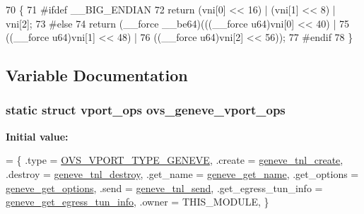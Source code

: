 \begin{DoxyCode}
70 \{
71 \textcolor{preprocessor}{#ifdef \_\_BIG\_ENDIAN}
72     \textcolor{keywordflow}{return} (vni[0] << 16) | (vni[1] << 8) | vni[2];
73 \textcolor{preprocessor}{#else}
74     \textcolor{keywordflow}{return} (\_\_force \_\_be64)(((\_\_force u64)vni[0] << 40) |
75                 ((\_\_force u64)vni[1] << 48) |
76                 ((\_\_force u64)vni[2] << 56));
77 \textcolor{preprocessor}{#endif}
78 \}
\end{DoxyCode}


\subsection{Variable Documentation}
\hypertarget{vport-geneve_8c_ad9b8555c118ad2e5874c3ab931390752}{}
\subsubsection[{ovs\+\_\+geneve\+\_\+vport\+\_\+ops}]{\setlength{\rightskip}{0pt plus 5cm}static struct {\bf vport\+\_\+ops} ovs\+\_\+geneve\+\_\+vport\+\_\+ops\hspace{0.3cm}{\ttfamily [static]}}\label{vport-geneve_8c_ad9b8555c118ad2e5874c3ab931390752}
{\bfseries Initial value\+:}
\begin{DoxyCode}
= \{
    .type           = \hyperlink{openvswitch_8h_a9a1b861aa99bd83177a2b10b34745b0aa8b60aa1406bfa154f35ede891a4ea382}{OVS\_VPORT\_TYPE\_GENEVE},
    .create         = \hyperlink{vport-geneve_8c_a6b9a4a56d5a598c17c0bbfffce774798}{geneve\_tnl\_create},
    .destroy        = \hyperlink{vport-geneve_8c_ab0a5d6fd5319e6c71acd2af4bde2c833}{geneve\_tnl\_destroy},
    .get\_name       = \hyperlink{vport-geneve_8c_a8f9770cc8d8fc8fad0f6f05a783513df}{geneve\_get\_name},
    .get\_options        = \hyperlink{vport-geneve_8c_a08a891b83a07b3300134c1340f329e84}{geneve\_get\_options},
    .send           = \hyperlink{vport-geneve_8c_af7cfa0fa94438ef4fddf79129f8346d4}{geneve\_tnl\_send},
    .get\_egress\_tun\_info    = \hyperlink{vport-geneve_8c_aed60d6de8f65dc856030e1ff6196b198}{geneve\_get\_egress\_tun\_info},
    .owner          = THIS\_MODULE,
\}
\end{DoxyCode}
